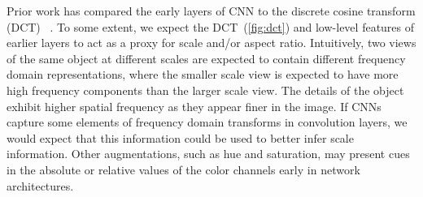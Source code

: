 Prior work has compared the early layers of CNN to the discrete cosine transform (DCT) ~\cite{gueguen2018faster}.
To some extent, we expect the DCT~(\autoref{fig:dct}) and low-level features of earlier layers to act as a proxy for scale and/or aspect ratio.
Intuitively, two views of the same object at different scales are expected to contain different frequency domain representations, where the smaller scale view is expected to have more high frequency components than the larger scale view.
The details of the object exhibit higher spatial frequency as they appear finer in the image. 
If CNNs capture some elements of frequency domain transforms in convolution layers, we would expect that this information could be used to better infer scale information.
Other augmentations, such as hue and saturation, may present cues in the absolute or relative values of the color channels early in network architectures.


